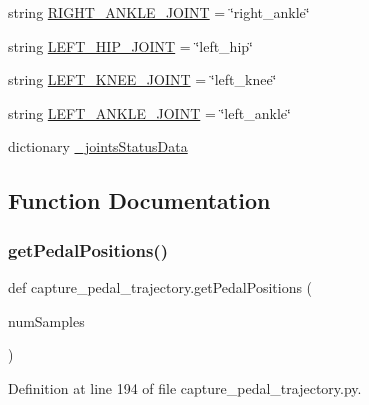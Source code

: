 \begin{DoxyCompactItemize}
\item 
string \mbox{\hyperlink{namespacecapture__pedal__trajectory_aeaa979292407a578df6b6ed8088b908d}{R\+I\+G\+H\+T\+\_\+\+A\+N\+K\+L\+E\+\_\+\+J\+O\+I\+NT}} = \char`\"{}right\+\_\+ankle\char`\"{}
\item 
string \mbox{\hyperlink{namespacecapture__pedal__trajectory_ae837fb7d509f64b8c35bad991e20eb06}{L\+E\+F\+T\+\_\+\+H\+I\+P\+\_\+\+J\+O\+I\+NT}} = \char`\"{}left\+\_\+hip\char`\"{}
\item 
string \mbox{\hyperlink{namespacecapture__pedal__trajectory_a4ac7e5482c7632b894bddac8c4e4c314}{L\+E\+F\+T\+\_\+\+K\+N\+E\+E\+\_\+\+J\+O\+I\+NT}} = \char`\"{}left\+\_\+knee\char`\"{}
\item 
string \mbox{\hyperlink{namespacecapture__pedal__trajectory_a498ea7bdb7ff782e4c26e38ec4c119c7}{L\+E\+F\+T\+\_\+\+A\+N\+K\+L\+E\+\_\+\+J\+O\+I\+NT}} = \char`\"{}left\+\_\+ankle\char`\"{}
\item 
dictionary \mbox{\hyperlink{namespacecapture__pedal__trajectory_a240d770bc46f43f1b4e5591bf959fd9b}{\+\_\+joints\+Status\+Data}}
\end{DoxyCompactItemize}


\subsection{Function Documentation}
\mbox{\label{namespacecapture__pedal__trajectory_a73fc41de533fbb350b426e9c08886203}} 
\subsubsection{\texorpdfstring{getPedalPositions()}{getPedalPositions()}}
{\footnotesize\ttfamily def capture\+\_\+pedal\+\_\+trajectory.\+get\+Pedal\+Positions (\begin{DoxyParamCaption}\item[{}]{num\+Samples }\end{DoxyParamCaption})}



Definition at line 194 of file capture\+\_\+pedal\+\_\+trajectory.\+py.



